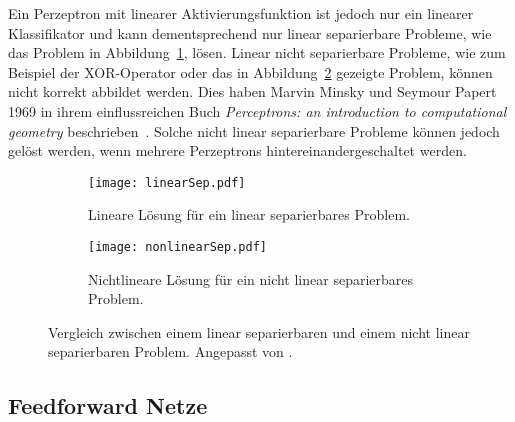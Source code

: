 Ein Perzeptron mit linearer Aktivierungsfunktion ist jedoch nur ein linearer Klassifikator und kann dementsprechend nur linear separierbare Probleme, wie das Problem in Abbildung~\ref{subfig:linearSep}, lösen.
Linear nicht separierbare Probleme, wie zum Beispiel der XOR-Operator oder das in Abbildung~\ref{subfig:nonlinearSep} gezeigte Problem, können nicht korrekt abbildet werden.
Dies haben Marvin Minsky und Seymour Papert 1969 in ihrem einflussreichen Buch \textit{Perceptrons: an introduction to computational geometry} beschrieben~\cite[Unterabschnitt 1.2.1]{Goodfellow-et-al-2016}.
Solche nicht linear separierbare Probleme können jedoch gelöst werden, wenn mehrere Perzeptrons hintereinandergeschaltet werden.


\begin{figure}[h]
	\centering
	\begin{subfigure}[t]{0.4\textwidth}
		\texttt{[image: linearSep.pdf]}
		\caption{Lineare Lösung für ein linear separierbares Problem.}
		\label{subfig:linearSep}
	\end{subfigure}
	\quad
	\begin{subfigure}[t]{0.4\textwidth}
		\texttt{[image: nonlinearSep.pdf]}
		\caption{Nichtlineare Lösung für ein nicht linear separierbares Problem.}
		\label{subfig:nonlinearSep}
	\end{subfigure}
	\caption{Vergleich zwischen einem linear separierbaren und einem nicht linear separierbaren Problem. Angepasst von \cite{LinSep}.}
	\label{fig:linearNonlinearVgl}
\end{figure}

\subsection{Feedforward Netze}


